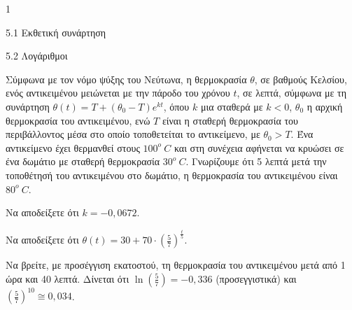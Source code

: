 \begin{ylh}{1}
\item 5.1 Εκθετική συνάρτηση
\item 5.2 Λογάριθμοι
\end{ylh}
Σύμφωνα με τον νόμο ψύξης του Νεύτωνα, η θερμοκρασία $\theta$, σε βαθμούς Κελσίου, ενός αντικειμένου μειώνεται με την πάροδο του χρόνου $t$, σε λεπτά, σύμφωνα με τη συνάρτηση $\theta(t) = T + (\theta_{0} - Τ)e^{kt}$, όπου $k$ μια σταθερά με $k < 0$, $\theta_{0}$ η αρχική θερμοκρασία του αντικειμένου, ενώ $Τ$ είναι η σταθερή θερμοκρασία του περιβάλλοντος μέσα στο οποίο τοποθετείται το αντικείμενο, με $\theta_{0} > Τ$.
Ένα αντικείμενο έχει θερμανθεί στους $100^{ο}\ C$ και στη συνέχεια αφήνεται να κρυώσει σε ένα δωμάτιο με σταθερή θερμοκρασία $30^{ο}\ C$. Γνωρίζουμε ότι 5 λεπτά μετά την τοποθέτησή του αντικειμένου στο δωμάτιο, η θερμοκρασία του αντικειμένου είναι $80^{ο}\ C$.
\begin{alist}
\item Να αποδείξετε ότι $k = - 0,0672$.
\item Να αποδείξετε ότι $\theta(t) = 30 + 70 \cdot \left( \frac{5}{7} \right)^{\frac{t}{5}}$.
\item Να βρείτε, με προσέγγιση εκατοστού, τη θερμοκρασία του αντικειμένου μετά από 1 ώρα και 40 λεπτά.
Δίνεται ότι $\ln\left( \frac{5}{7} \right) = - 0,336$ (προσεγγιστικά) και $\left( \frac{5}{7} \right)^{10} \cong 0,034$.
\end{alist}

